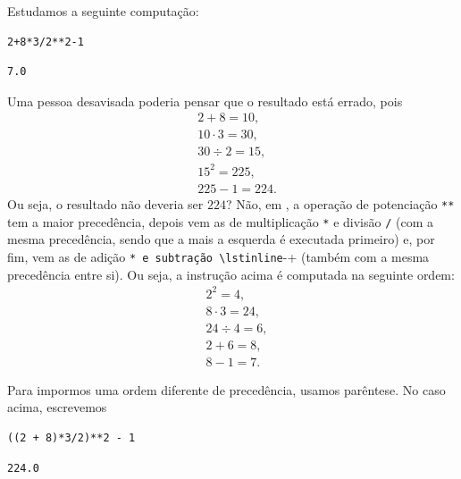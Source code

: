 \begin{ex}
  Estudamos a seguinte computação:

\begin{lstlisting}
2+8*3/2**2-1
\end{lstlisting}

\begin{verbatim}
7.0
\end{verbatim}

  Uma pessoa desavisada poderia pensar que o resultado está errado, pois
  \begin{align}
    &2+8 = 10,\\
    &10 \cdot 3 = 30,\\
    &30 \div 2 = 15,\\
    &15^2 = 225,\\
    &225 - 1 = 224.
  \end{align}
  Ou seja, o resultado não deveria ser $224$? Não, em {\python}, a operação de potenciação \lstinline+**+ tem a maior precedência, depois vem as de multiplicação \lstinline+*+ e divisão \lstinline+/+ (com a mesma precedência, sendo que a mais a esquerda é executada primeiro) e, por fim, vem as de adição \lstinline*+* e subtração \lstinline+-+ (também com a mesma precedência entre si). Ou seja, a instrução acima é computada na seguinte ordem:
  \begin{align}
    &2^2 = 4,\\
    &8\cdot 3 = 24,\\
    &24\div 4 = 6,\\
    &2 + 6 = 8,\\
    &8 - 1 = 7.
  \end{align}

  Para impormos uma ordem diferente de precedência, usamos parêntese. No caso acima, escrevemos

\begin{lstlisting}
((2 + 8)*3/2)**2 - 1
\end{lstlisting}

\begin{verbatim}
224.0
\end{verbatim}

\end{ex}

